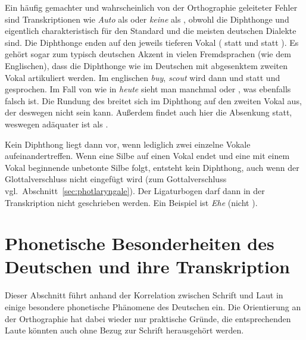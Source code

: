 \begin{exe}
  \ex\label{ex:phot2005}
  \begin{xlist}
  \end{xlist}
\end{exe}

Ein häufig gemachter und wahrscheinlich von der Orthographie geleiteter Fehler sind Transkriptionen wie \textit{Auto} als \Ast\textipa{[P\t{aU}to]} oder \textit{keine} als \Ast\textipa{[k\t{aI}ne]}, obwohl die Diphthonge \textipa{[\t{aE}]} und \textipa{[\t{aO}]} eigentlich charakteristisch für den Standard und die meisten deutschen Dialekte sind.
Die Diphthonge enden auf den jeweils tieferen Vokal (\textipa{[O]} statt \textipa{[U]} und \textipa{[E]} statt \textipa{[I]}).
Es gehört sogar zum typisch deutschen Akzent in vielen Fremdsprachen (wie \zB dem Englischen), dass die Diphthonge wie im Deutschen mit abgesenktem zweiten Vokal artikuliert werden.
Im englischen \textit{buy}, \textit{scout} wird dann \textipa{[b\t{aE}]} und \textipa{[sk\t{aO}t]} statt \textipa{[b\t{aI}]} und \textipa{[sk\t{aU}t]} gesprochen.
Im Fall von \textipa{[\t{O\oe}]} wie in \textit{heute} \textipa{[h\t{O\oe}t@]} sieht man manchmal \textipa{[\t{OI}]} oder \textipa{[\t{OY}]}, was ebenfalls falsch ist.
Die Rundung des \textipa{[o]} breitet sich im Diphthong auf den zweiten Vokal aus, der deswegen nicht \textipa{[I]} sein kann.
Außerdem findet auch hier die Absenkung statt, weswegen \textipa{[\t{O\oe}]} adäquater ist als \textipa{[\t{OY}]}.

Kein Diphthong liegt dann vor, wenn lediglich zwei einzelne Vokale aufeinandertreffen.
Wenn eine Silbe auf einen Vokal endet und eine mit einem Vokal beginnende unbetonte Silbe folgt, entsteht kein Diphthong, auch wenn der Glottalverschluss nicht eingefügt wird (zum Gottalverschluss vgl.\ Abschnitt~\ref{sec:photlaryngale}).
Der Ligaturbogen darf dann in der Transkription nicht geschrieben werden.
Ein Beispiel ist \textit{Ehe} \textipa{[Pe:@]} (nicht \Ast\textipa{[P\t{e@}]}).

\section{Phonetische Besonderheiten des Deutschen und ihre Transkription}

\label{sec:phonetischebesonderheiten}

Dieser Abschnitt führt anhand der Korrelation zwischen Schrift und Laut in einige besondere phonetische Phänomene des Deutschen ein.
Die Orientierung an der Orthographie hat dabei wieder nur praktische Gründe, die entsprechenden Laute könnten auch ohne Bezug zur Schrift herausgehört werden.

